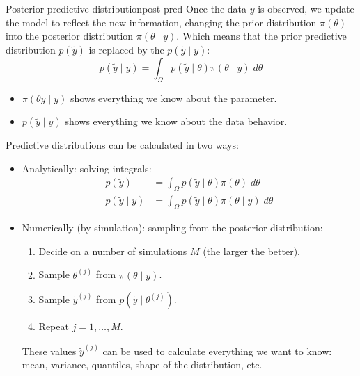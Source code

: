 \begin{definition}{Posterior predictive distribution}{post-pred}
	Once the data $y$ is observed, we update the model to reflect the new information,
	changing the prior distribution $\pi(\theta)$ into the posterior distribution $\pi(\theta \mid y)$.
	Which means that the prior predictive distribution $p(\tilde y)$ is replaced by the
	 $p(\tilde y \mid y)$:
	\begin{equation}
		p(\tilde y \mid y) = \int_{\Omega} p(\tilde y \mid \theta) \pi(\theta \mid y) \;d\theta
	\end{equation}

    \tcblower
    \begin{note}
        \begin{itemize}
            \item $\pi(\theta y \mid y)$ shows everything we know about the parameter.
            \item $p(\tilde y \mid y)$ shows everything we know about the data behavior.
        \end{itemize}
    \end{note}
\end{definition}

Predictive distributions can be calculated in two ways:
\begin{itemize}
	\item Analytically: solving integrals:
	      \begin{align*}
		      p(\tilde y)        & = \int_{\Omega} p(\tilde y \mid \theta) \pi(\theta) \;d\theta        \\
		      p(\tilde y \mid y) & = \int_{\Omega} p(\tilde y \mid \theta) \pi(\theta \mid y) \;d\theta
	      \end{align*}
	\item Numerically (by simulation): sampling from the posterior distribution:
	      \begin{enumerate}
		      \item Decide on a number of simulations $M$ (the larger the better).
		      \item Sample $\theta^{(j)}$ from $\pi(\theta \mid y)$.
		      \item Sample $\tilde y^{(j)}$ from $p(\tilde y \mid \theta^{(j)})$.
		      \item Repeat $j=1,\ldots,M$.
	      \end{enumerate}
	      These values $\tilde y^{(j)}$ can be used to calculate everything we want to know:
	      mean, variance, quantiles, shape of the distribution, etc.
\end{itemize}

